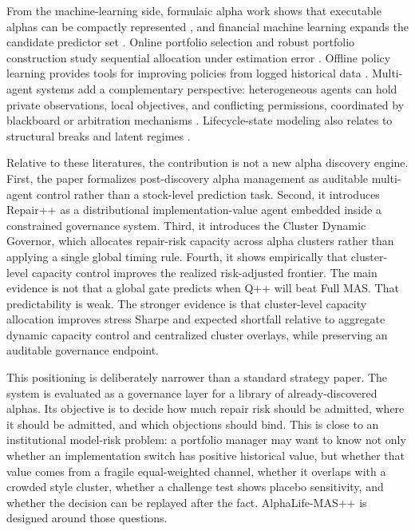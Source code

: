 \documentclass[sigconf,nonacm]{acmart}
\begin{document}
From the machine-learning side, formulaic alpha work shows that executable alphas can be compactly represented \cite{kakushadze2016formulaic}, and financial machine learning expands the candidate predictor set \cite{gu2020empirical}. Online portfolio selection and robust portfolio construction study sequential allocation under estimation error \cite{cover1991universal,li2014online,demiguel2009optimal,ledoit2004well}. Offline policy learning provides tools for improving policies from logged historical data \cite{dudik2011doubly,sutton2018reinforcement}. Multi-agent systems add a complementary perspective: heterogeneous agents can hold private observations, local objectives, and conflicting permissions, coordinated by blackboard or arbitration mechanisms \cite{hayesroth1985blackboard,stone2000multiagent,wooldridge2009introduction,shoham2008multiagent}. Lifecycle-state modeling also relates to structural breaks and latent regimes \cite{bai1998estimating,rabiner1989tutorial,adams2007bayesian}.

Relative to these literatures, the contribution is not a new alpha discovery engine. First, the paper formalizes post-discovery alpha management as auditable multi-agent control rather than a stock-level prediction task. Second, it introduces Repair++ as a distributional implementation-value agent embedded inside a constrained governance system. Third, it introduces the Cluster Dynamic Governor, which allocates repair-risk capacity across alpha clusters rather than applying a single global timing rule. Fourth, it shows empirically that cluster-level capacity control improves the realized risk-adjusted frontier. The main evidence is not that a global gate predicts when Q++ will beat Full MAS. That predictability is weak. The stronger evidence is that cluster-level capacity allocation improves stress Sharpe and expected shortfall relative to aggregate dynamic capacity control and centralized cluster overlays, while preserving an auditable governance endpoint.

This positioning is deliberately narrower than a standard strategy paper. The system is evaluated as a governance layer for a library of already-discovered alphas. Its objective is to decide how much repair risk should be admitted, where it should be admitted, and which objections should bind. This is close to an institutional model-risk problem: a portfolio manager may want to know not only whether an implementation switch has positive historical value, but whether that value comes from a fragile equal-weighted channel, whether it overlaps with a crowded style cluster, whether a challenge test shows placebo sensitivity, and whether the decision can be replayed after the fact. AlphaLife-MAS++ is designed around those questions.
\end{document}

